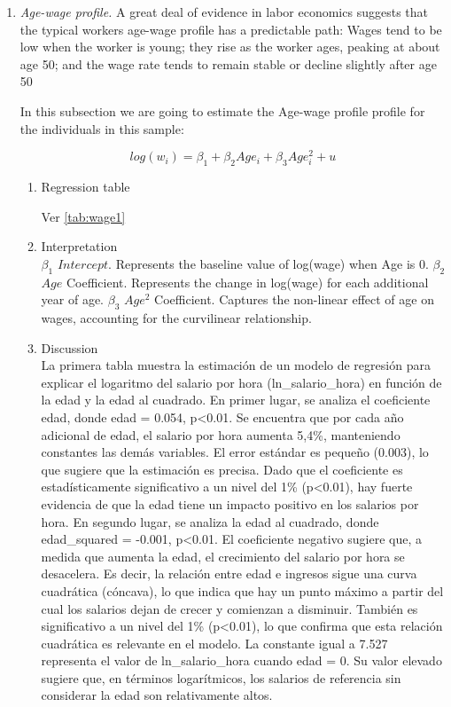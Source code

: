 \documentclass[12pt,a4paper,onecolumn]{article}
\begin{document}
\begin{enumerate}
\begin{enumerate}
\end{enumerate}

 
    \item \textit{Age-wage profile.} A great deal of evidence in labor economics suggests that the typical workers age-wage profile has a predictable path: Wages tend to be low when the worker is young; they rise as the worker ages, peaking at about age 50; and the wage rate tends to remain stable or decline slightly after age 50

    In this subsection we are going to estimate the Age-wage profile profile for the individuals in this sample:

    \begin{equation}
    log(w_{i}) = \beta_{1} +\beta_{2}Age_{i} + \beta_{3}Age_{i}^{2} + u
    \end{equation}

    \begin{enumerate}
    \item Regression table
    
     Ver \ref{tab:wage1} 
    
    \item Interpretation\\
    $\beta_{1}$ $Intercept$. Represents the baseline value of log(wage) when Age is 0.
    $\beta_{2}$ $Age$ Coefficient. Represents the change in log(wage) for each additional year of age.
    $\beta_{3}$ $Age^{2}$ Coefficient. Captures the non-linear effect of age on wages, accounting for the curvilinear relationship.


    
    \item Discussion \\
    La primera tabla muestra la estimaci\'on de un modelo de regresi\'on para explicar el logaritmo del salario por hora (ln\_salario\_hora) en funci\'on de la edad y la edad al cuadrado. En primer lugar, se analiza el coeficiente edad, donde edad = 0.054, p<0.01. Se encuentra que por cada a\~no adicional de edad, el salario por hora aumenta 5,4\%, manteniendo constantes las dem\'as variables. El error est\'andar es peque\~no (0.003), lo que sugiere que la estimaci\'on es precisa. Dado que el coeficiente es estad\'isticamente significativo a un nivel del 1\% (p<0.01), hay fuerte evidencia de que la edad tiene un impacto positivo en los salarios por hora. En segundo lugar, se analiza la edad al cuadrado, donde edad\_squared = -0.001, p<0.01. El coeficiente negativo sugiere que, a medida que aumenta la edad, el crecimiento del salario por hora se desacelera. Es decir, la relaci\'on entre edad e ingresos sigue una curva cuadr\'atica (c\'oncava), lo que indica que hay un punto m\'aximo a partir del cual los salarios dejan de crecer y comienzan a disminuir. Tambi\'en es significativo a un nivel del 1\% (p<0.01), lo que confirma que esta relaci\'on cuadr\'atica es relevante en el modelo. La constante igual a 7.527 representa el valor de ln\_salario\_hora cuando edad = 0. Su valor elevado sugiere que, en t\'erminos logar\'itmicos, los salarios de referencia sin considerar la edad son relativamente altos. 


\end{enumerate}
\end{enumerate}
\end{document}
